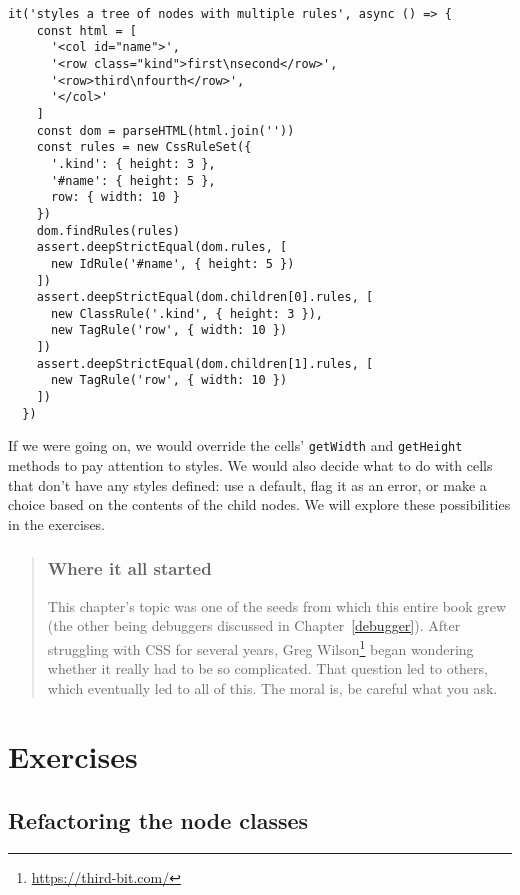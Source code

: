 \documentclass[krantzl]{krantz}
\newcommand{\chapref}[1]{Chapter~\ref{#1}}
\newenvironment{callout}{\savenotes\begin{tBox}\begin{quotation}\toggletrue{inbox}\renewcommand{\thempfootnote}{\arabic{footnote}}}{\end{quotation}\vspace{\baselineskip}\end{tBox}\togglefalse{inbox}\spewnotes}
\newcommand{\hreffoot}[2]{{#1}\footnote{\href{#2}{#2}}}
\begin{document}
\begin{lstlisting}[frame=single,frameround=tttt]
  it('styles a tree of nodes with multiple rules', async () => {
    const html = [
      '<col id="name">',
      '<row class="kind">first\nsecond</row>',
      '<row>third\nfourth</row>',
      '</col>'
    ]
    const dom = parseHTML(html.join(''))
    const rules = new CssRuleSet({
      '.kind': { height: 3 },
      '#name': { height: 5 },
      row: { width: 10 }
    })
    dom.findRules(rules)
    assert.deepStrictEqual(dom.rules, [
      new IdRule('#name', { height: 5 })
    ])
    assert.deepStrictEqual(dom.children[0].rules, [
      new ClassRule('.kind', { height: 3 }),
      new TagRule('row', { width: 10 })
    ])
    assert.deepStrictEqual(dom.children[1].rules, [
      new TagRule('row', { width: 10 })
    ])
  })
\end{lstlisting}



If we were going on,
we would override the cells' \texttt{getWidth} and \texttt{getHeight} methods to pay attention to styles.
We would also decide what to do with cells that don't have any styles defined:
use a default,
flag it as an error,
or make a choice based on the contents of the child nodes.
We will explore these possibilities in the exercises.

\begin{callout}


\subsubsection*{Where it all started}


This chapter's topic was one of the seeds from which this entire book grew
(the other being debuggers discussed in \chapref{debugger}).
After struggling with CSS for several years,
\hreffoot{Greg Wilson}{https://third-bit.com/} began wondering whether it really had to be so complicated.
That question led to others,
which eventually led to all of this.
The moral is,
be careful what you ask.

\end{callout}


\section{Exercises}\label{layout-engine-exercises}

\subsection*{Refactoring the node classes}
\end{document}
